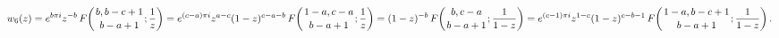 \[w_{6}(z)=e^{b\pi i}z^{-b}\mathop{F\/}\nolimits\!\left({b,b-c+1\atop b-a+1};%
\frac{1}{z}\right)=e^{(c-a)\pi i}z^{a-c}(1-z)^{c-a-b}\*\mathop{F\/}\nolimits\!%
\left({1-a,c-a\atop b-a+1};\frac{1}{z}\right)=(1-z)^{-b}\mathop{F\/}\nolimits%
\!\left({b,c-a\atop b-a+1};\frac{1}{1-z}\right)=e^{(c-1)\pi i}z^{1-c}(1-z)^{c-%
b-1}\*\mathop{F\/}\nolimits\!\left({1-a,b-c+1\atop b-a+1};\frac{1}{1-z}\right).\]